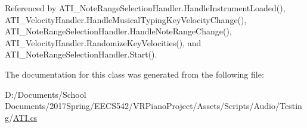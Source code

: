 Referenced by A\+T\+I\+\_\+\+Note\+Range\+Selection\+Handler.\+Handle\+Instrument\+Loaded(), A\+T\+I\+\_\+\+Velocity\+Handler.\+Handle\+Musical\+Typing\+Key\+Velocity\+Change(), A\+T\+I\+\_\+\+Note\+Range\+Selection\+Handler.\+Handle\+Note\+Range\+Change(), A\+T\+I\+\_\+\+Velocity\+Handler.\+Randomize\+Key\+Velocities(), and A\+T\+I\+\_\+\+Note\+Range\+Selection\+Handler.\+Start().



The documentation for this class was generated from the following file\+:\begin{DoxyCompactItemize}
\item 
D\+:/\+Documents/\+School Documents/2017\+Spring/\+E\+E\+C\+S542/\+V\+R\+Piano\+Project/\+Assets/\+Scripts/\+Audio/\+Testing/\hyperlink{_a_t_i_8cs}{A\+T\+I.\+cs}\end{DoxyCompactItemize}

